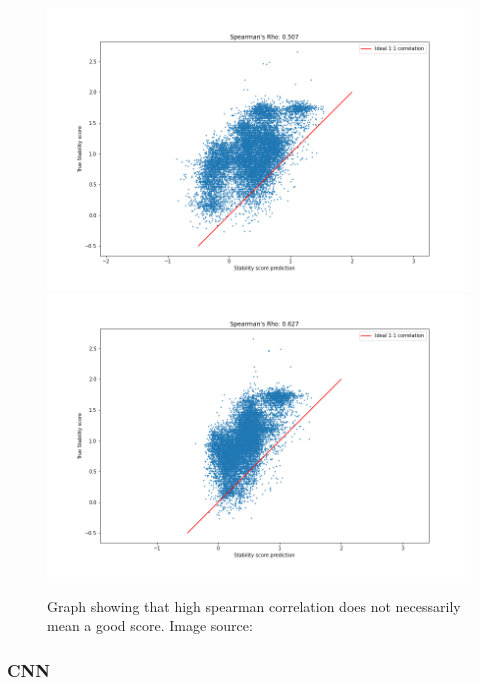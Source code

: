 \begin{figure}[!ht]
  \centering
  \includegraphics[width=0.4\linewidth]{latex/imgs/spearman_1_layer_with_schedule_1024_final.png}
  \includegraphics[width=0.4\linewidth]{latex/imgs/spearman_1_layer_with_schedule_1024_minloss.png}
  \caption{Graph showing that high spearman correlation does not necessarily mean a good score. Image source:\cite{spearman}}
\end{figure}

\subsubsection{CNN}
